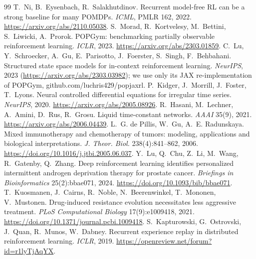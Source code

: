\documentclass[10pt]{article}
\begin{document}
\begin{thebibliography}{99}
 T.~Ni, B.~Eysenbach, R.~Salakhutdinov. Recurrent model-free RL
can be a strong baseline for many POMDPs. \emph{ICML}, PMLR 162, 2022. \url{https://arxiv.org/abs/2110.05038}.
 S.~Morad, R.~Kortvelesy, M.~Bettini, S.~Liwicki,
A.~Prorok. POPGym: benchmarking partially observable reinforcement learning.
\emph{ICLR}, 2023. \url{https://arxiv.org/abs/2303.01859}.
 C.~Lu, Y.~Schroecker, A.~Gu, E.~Parisotto, J.~Foerster, S.~Singh, F.~Behbahani. Structured state space models for in-context reinforcement learning. \emph{NeurIPS}, 2023 (\url{https://arxiv.org/abs/2303.03982}); we use only its JAX re-implementation of POPGym, github.com/luchris429/popjaxrl.
 P.~Kidger, J.~Morrill, J.~Foster, T.~Lyons. Neural
controlled differential equations for irregular time series. \emph{NeurIPS},
2020. \url{https://arxiv.org/abs/2005.08926}.
 R.~Hasani, M.~Lechner, A.~Amini, D.~Rus, R.~Grosu. Liquid
time-constant networks. \emph{AAAI} 35(9), 2021. \url{https://arxiv.org/abs/2006.04439}.
 L.~G. de Pillis, W.~Gu, A.~E. Radunskaya. Mixed immunotherapy and
chemotherapy of tumors: modeling, applications and biological interpretations. \emph{J. Theor. Biol.} 238(4):841--862, 2006. \url{https://doi.org/10.1016/j.jtbi.2005.06.037}.
 Y.~Lu, Q.~Chu, Z.~Li, M.~Wang, R.~Gatenby, Q.~Zhang. Deep reinforcement
learning identifies personalized intermittent androgen deprivation therapy for prostate cancer. \emph{Briefings in Bioinformatics} 25(2):bbae071, 2024.
\url{https://doi.org/10.1093/bib/bbae071}.
 T.~Kuosmanen, J.~Cairns, R.~Noble, N.~Beerenwinkel, T.~Mononen, V.~Mustonen.
Drug-induced resistance evolution necessitates less aggressive treatment. \emph{PLoS Computational Biology} 17(9):e1009418, 2021.
\url{https://doi.org/10.1371/journal.pcbi.1009418}.
 S.~Kapturowski, G.~Ostrovski, J.~Quan, R.~Munos, W.~Dabney.
Recurrent experience replay in distributed reinforcement learning. \emph{ICLR},
2019. \url{https://openreview.net/forum?id=r1lyTjAqYX}.
\end{thebibliography}
\end{document}
